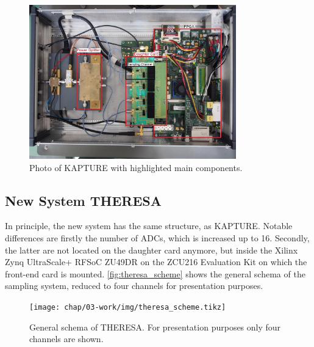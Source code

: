 \begin{figure}[H]
	\centering
	\includegraphics[width = 0.8\textwidth]{chap/03-work/img/kapture_sys}
	\caption{Photo of KAPTURE with highlighted main components. \cite[p.~61]{brosi}}
	\label{fig:kapturesys}
\end{figure}

\newpage
\subsection{New System THERESA}
In principle, the new system has the same structure, as KAPTURE. Notable differences are firstly the number of ADCs, which is increased up to 16. Secondly, the latter are not located on the daughter card anymore, but inside the Xilinx Zynq UltraScale+ RFSoC ZU49DR on the ZCU216 Evaluation Kit on which the front-end card is mounted. \autoref{fig:theresa_scheme} shows the general schema of the sampling system, reduced to four channels for presentation purposes.
\begin{figure}[H]
	\centering
	\texttt{[image: chap/03-work/img/theresa\_scheme.tikz]}
	\caption{General schema of THERESA. For presentation purposes only four channels are shown.}
	\label{fig:theresa_scheme}
\end{figure}

